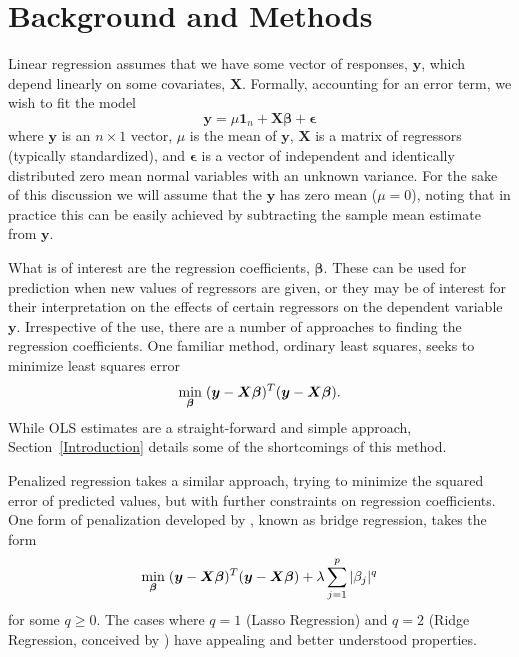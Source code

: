 \documentclass{uwstat572}
\begin{document}
\section{Background and Methods}
Linear regression assumes that we have some vector of responses, $\boldsymbol{y}$, which depend linearly on some covariates, $\boldsymbol{X}$. Formally, accounting for an error term, we wish to fit the model \[
\boldsymbol{y} = \mu \boldsymbol{1}_n + \boldsymbol{X}\boldsymbol{\beta}+\boldsymbol{\epsilon}
\] where $\boldsymbol{y}$ is an $n \times 1$ vector, $\mu$ is the mean of $\boldsymbol{y}$, $\boldsymbol{X}$ is a matrix of regressors (typically standardized), and $\boldsymbol{\epsilon}$ is a vector of independent and identically distributed zero mean normal variables with an unknown variance. For the sake of this discussion we will assume that the $\boldsymbol{y}$ has zero mean ($\mu=0$), noting that in practice this can be easily achieved by subtracting the sample mean estimate from $\mathbf{y}$.

What is of interest are the regression coefficients, $\boldsymbol{\beta}$. These can be used for prediction when new values of regressors are given, or they may be of interest for their interpretation on the effects of certain regressors on the dependent variable $\boldsymbol{y}$. Irrespective of the use, there are a number of approaches to finding the regression coefficients. One familiar method, ordinary least squares, seeks to minimize least squares error\[
\min_{\boldsymbol{\beta}} \hspace{.1cm} (\boldsymbol{y}-\boldsymbol{X}\boldsymbol{\beta})^T(\boldsymbol{y}-\boldsymbol{X}\boldsymbol{\beta}).
\] While OLS estimates are a straight-forward and simple approach, Section~\ref{Introduction} details some of the shortcomings of this method.

Penalized regression takes a similar approach, trying to minimize the squared error of predicted values, but with further constraints on regression coefficients. One form of penalization developed by \cite{fu1998penalized}, known as bridge regression, takes the form  \[
\min_{\boldsymbol{\beta}}  \hspace{.1cm} (\boldsymbol{y}-\boldsymbol{X}\boldsymbol{\beta})^T(\boldsymbol{y}-\boldsymbol{X}\boldsymbol{\beta})+\lambda\sum_{j=1}^p|\beta_j|^q
\] for some $q\geq0$. The cases where $q=1$ (Lasso Regression) and $q=2$ (Ridge Regression, conceived by \cite{hoerl1970ridge}) have appealing and better understood properties.
\end{document}
